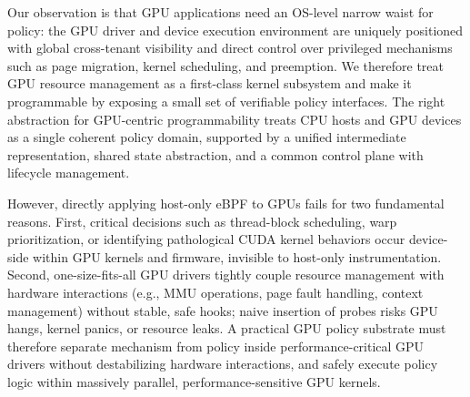 
Our observation is that GPU applications need an OS-level narrow waist for policy: the GPU driver and device execution environment are uniquely positioned with global cross-tenant visibility and direct control over privileged mechanisms such as page migration, kernel scheduling, and preemption. We therefore treat GPU resource management as a first-class kernel subsystem and make it programmable by exposing a small set of verifiable policy interfaces.
The right abstraction for GPU-centric programmability treats CPU hosts and GPU devices as a single coherent policy domain, supported by a unified intermediate representation, shared state abstraction, and a common control plane with lifecycle management. 


However, directly applying host-only eBPF to GPUs fails for two fundamental reasons. 
First, critical decisions such as thread-block scheduling, warp prioritization, or identifying pathological CUDA kernel behaviors occur device-side within GPU kernels and firmware, invisible to host-only instrumentation. 
Second, one-size-fits-all GPU drivers tightly couple resource management with hardware interactions (e.g., MMU operations, page fault handling, context management) without stable, safe hooks; naive insertion of probes risks GPU hangs, kernel panics, or resource leaks. 
A practical GPU policy substrate must therefore separate mechanism from policy inside performance-critical GPU drivers without destabilizing hardware interactions, and safely execute policy logic within massively parallel, performance-sensitive GPU kernels.

